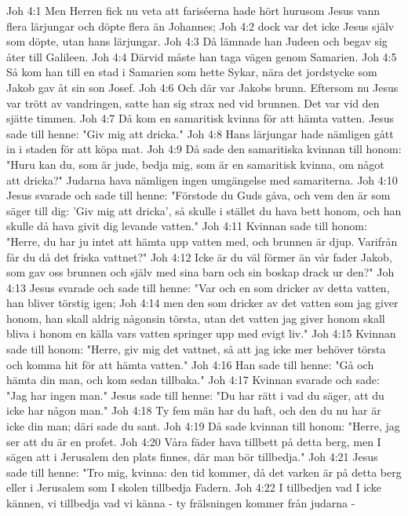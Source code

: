 Joh 4:1  Men Herren fick nu veta att fariséerna hade hört hurusom Jesus vann flera lärjungar och döpte flera än Johannes;
Joh 4:2  dock var det icke Jesus själv som döpte, utan hans lärjungar.
Joh 4:3  Då lämnade han Judeen och begav sig åter till Galileen.
Joh 4:4  Därvid måste han taga vägen genom Samarien.
Joh 4:5  Så kom han till en stad i Samarien som hette Sykar, nära det jordstycke som Jakob gav åt sin son Josef.
Joh 4:6  Och där var Jakobs brunn. Eftersom nu Jesus var trött av vandringen, satte han sig strax ned vid brunnen. Det var vid den sjätte timmen.
Joh 4:7  Då kom en samaritisk kvinna för att hämta vatten. Jesus sade till henne: "Giv mig att dricka."
Joh 4:8  Hans lärjungar hade nämligen gått in i staden för att köpa mat.
Joh 4:9  Då sade den samaritiska kvinnan till honom: "Huru kan du, som är jude, bedja mig, som är en samaritisk kvinna, om något att dricka?" Judarna hava nämligen ingen umgängelse med samariterna.
Joh 4:10  Jesus svarade och sade till henne: "Förstode du Guds gåva, och vem den är som säger till dig: 'Giv mig att dricka', så skulle i stället du hava bett honom, och han skulle då hava givit dig levande vatten."
Joh 4:11  Kvinnan sade till honom: "Herre, du har ju intet att hämta upp vatten med, och brunnen är djup. Varifrån får du då det friska vattnet?"
Joh 4:12  Icke är du väl förmer än vår fader Jakob, som gav oss brunnen och själv med sina barn och sin boskap drack ur den?"
Joh 4:13  Jesus svarade och sade till henne: "Var och en som dricker av detta vatten, han bliver törstig igen;
Joh 4:14  men den som dricker av det vatten som jag giver honom, han skall aldrig någonsin törsta, utan det vatten jag giver honom skall bliva i honom en källa vars vatten springer upp med evigt liv."
Joh 4:15  Kvinnan sade till honom: "Herre, giv mig det vattnet, så att jag icke mer behöver törsta och komma hit för att hämta vatten."
Joh 4:16  Han sade till henne: "Gå och hämta din man, och kom sedan tillbaka."
Joh 4:17  Kvinnan svarade och sade: "Jag har ingen man." Jesus sade till henne: "Du har rätt i vad du säger, att du icke har någon man."
Joh 4:18  Ty fem män har du haft, och den du nu har är icke din man; däri sade du sant.
Joh 4:19  Då sade kvinnan till honom: "Herre, jag ser att du är en profet.
Joh 4:20  Våra fäder hava tillbett på detta berg, men I sägen att i Jerusalem den plats finnes, där man bör tillbedja."
Joh 4:21  Jesus sade till henne: "Tro mig, kvinna: den tid kommer, då det varken är på detta berg eller i Jerusalem som I skolen tillbedja Fadern.
Joh 4:22  I tillbedjen vad I icke kännen, vi tillbedja vad vi känna - ty frälsningen kommer från judarna -
